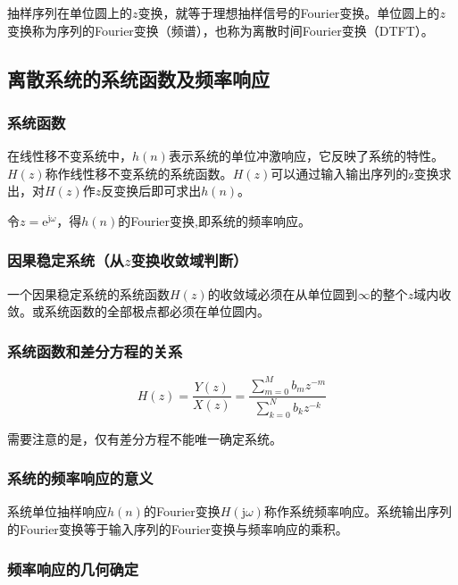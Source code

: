 \documentclass[cn, hazy, blue, normal, 14pt]{elegantnote}
\begin{document}
抽样序列在单位圆上的$z$变换，就等于理想抽样信号的Fourier变换。单位圆上的$z$变换称为序列的Fourier变换（频谱），也称为离散时间Fourier变换（DTFT）。

\subsection{离散系统的系统函数及频率响应}

\subsubsection{系统函数}

在线性移不变系统中，$h(n)$表示系统的单位冲激响应，它反映了系统的特性。$H(z)$称作线性移不变系统的系统函数。$H(z)$可以通过输入输出序列的z变换求出，对$H(z)$作$z$反变换后即可求出$h(n)$。

令$z=\text{e}^{\text{j}\omega}$，得$h(n)$的Fourier变换,即系统的频率响应。

\subsubsection{因果稳定系统（从$z$变换收敛域判断）}

一个因果稳定系统的系统函数$H(z)$的收敛域必须在从单位圆到$\infty$的整个$z$域内收敛。或系统函数的全部极点都必须在单位圆内。

\subsubsection{系统函数和差分方程的关系}

\begin{equation}
    H(z)=\frac{Y(z)}{X(z)}=\frac{\sum\limits_{m=0}^{M}{b_{m}z^{-m}}}{\sum\limits_{k=0}^{N}{b_{k}z^{-k}}}
\end{equation}

需要注意的是，仅有差分方程不能唯一确定系统。

\subsubsection{系统的频率响应的意义}

系统单位抽样响应$h(n)$的Fourier变换$H(\text{j}\omega)$称作系统频率响应。系统输出序列的Fourier变换等于输入序列的Fourier变换与频率响应的乘积。

\subsubsection{频率响应的几何确定}
\end{document}
